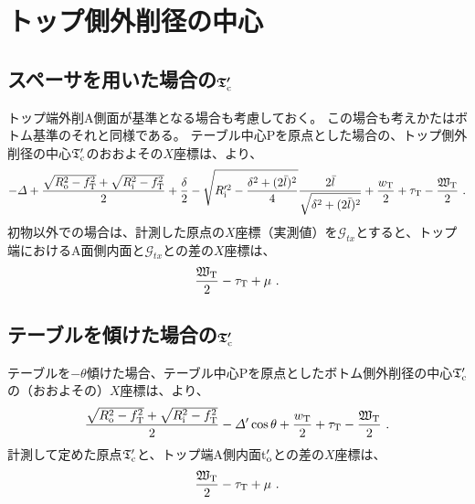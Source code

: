 \clearpage
\section{トップ側外削径の中心}


\subsection[スペーサを用いた場合の$\mathfrak T_\text c'$]
           {スペーサを用いた場合の$\boldsymbol{\mathfrak T_\text c'}$}
トップ端外削A側面が基準となる場合も考慮しておく。
この場合も考えかたはボトム基準のそれと同様である。
テーブル中心Pを原点とした場合の、トップ側外削径の中心$\mathfrak T_\text c'$のおおよその$X$座標は、より、
\begin{align*}
  -\varDelta+\frac{\sqrt{R_\text o^2-f_\text T^2}+\sqrt{R_\text i^2-f_\text T^2}}2+\frac\delta2
  -\sqrt{R_\text i'^2-\frac{\delta^2+(2\bar l)^2}4}\frac{2\bar l}{\sqrt{\delta^2+(2\bar l)^2}}
  +\frac{w_\text T}2+\tau_\text T-\frac{\mathfrak W_\text T}2\ .
\end{align*}
初物以外での場合は、計測した原点の$X$座標（実測値）を$\mathcal G_{tx}$とすると、トップ端におけるA面側内面と$\mathcal G_{tx}$との差の$X$座標は、
\begin{align*}
  \frac{\mathfrak W_\text T}2-\tau_\text T+\mu~.
\end{align*}


\subsection[テーブルを傾けた場合の$\mathfrak T_\text c'$]
           {テーブルを傾けた場合の$\boldsymbol{\mathfrak T_\text c'}$}
テーブルを$-\theta$傾けた場合、テーブル中心Pを原点としたボトム側外削径の中心$\mathfrak T_\text c'$の（おおよその）$X$座標は、より、
\begin{align*}
  \frac{\sqrt{R_\text o^2-f_\text T^2}+\sqrt{R_\text i^2-f_\text T^2}}2-\varDelta'\cos\theta
  +\frac{w_\text T}2+\tau_\text T-\frac{\mathfrak W_\text T}2\ .
\end{align*}
計測して定めた原点$\mathfrak T_\text c'$と、トップ端A側内面t$_\text o'$との差の$X$座標は、
\begin{align*}
  \frac{\mathfrak W_\text T}2-\tau_\text T+\mu~.
\end{align*}





